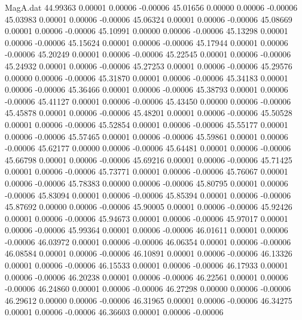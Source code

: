 \begin{filecontents}{MagA.dat}
  44.99363    0.00001    0.00006   -0.00006
  45.01656    0.00000    0.00006   -0.00006
  45.03983    0.00001    0.00006   -0.00006
  45.06324    0.00001    0.00006   -0.00006
  45.08669    0.00001    0.00006   -0.00006
  45.10991    0.00000    0.00006   -0.00006
  45.13298    0.00001    0.00006   -0.00006
  45.15624    0.00001    0.00006   -0.00006
  45.17944    0.00001    0.00006   -0.00006
  45.20249    0.00001    0.00006   -0.00006
  45.22545    0.00001    0.00006   -0.00006
  45.24932    0.00001    0.00006   -0.00006
  45.27253    0.00001    0.00006   -0.00006
  45.29576    0.00000    0.00006   -0.00006
  45.31870    0.00001    0.00006   -0.00006
  45.34183    0.00001    0.00006   -0.00006
  45.36466    0.00001    0.00006   -0.00006
  45.38793    0.00001    0.00006   -0.00006
  45.41127    0.00001    0.00006   -0.00006
  45.43450    0.00000    0.00006   -0.00006
  45.45878    0.00001    0.00006   -0.00006
  45.48201    0.00001    0.00006   -0.00006
  45.50528    0.00001    0.00006   -0.00006
  45.52854    0.00001    0.00006   -0.00006
  45.55177    0.00001    0.00006   -0.00006
  45.57465    0.00001    0.00006   -0.00006
  45.59861    0.00001    0.00006   -0.00006
  45.62177    0.00000    0.00006   -0.00006
  45.64481    0.00001    0.00006   -0.00006
  45.66798    0.00001    0.00006   -0.00006
  45.69216    0.00001    0.00006   -0.00006
  45.71425    0.00001    0.00006   -0.00006
  45.73771    0.00001    0.00006   -0.00006
  45.76067    0.00001    0.00006   -0.00006
  45.78383    0.00000    0.00006   -0.00006
  45.80795    0.00001    0.00006   -0.00006
  45.83094    0.00001    0.00006   -0.00006
  45.85394    0.00001    0.00006   -0.00006
  45.87692    0.00000    0.00006   -0.00006
  45.90005    0.00001    0.00006   -0.00006
  45.92426    0.00001    0.00006   -0.00006
  45.94673    0.00001    0.00006   -0.00006
  45.97017    0.00001    0.00006   -0.00006
  45.99364    0.00001    0.00006   -0.00006
  46.01611    0.00001    0.00006   -0.00006
  46.03972    0.00001    0.00006   -0.00006
  46.06354    0.00001    0.00006   -0.00006
  46.08584    0.00001    0.00006   -0.00006
  46.10891    0.00001    0.00006   -0.00006
  46.13326    0.00001    0.00006   -0.00006
  46.15533    0.00001    0.00006   -0.00006
  46.17933    0.00001    0.00006   -0.00006
  46.20238    0.00001    0.00006   -0.00006
  46.22561    0.00001    0.00006   -0.00006
  46.24860    0.00001    0.00006   -0.00006
  46.27298    0.00000    0.00006   -0.00006
  46.29612    0.00000    0.00006   -0.00006
  46.31965    0.00001    0.00006   -0.00006
  46.34275    0.00001    0.00006   -0.00006
  46.36603    0.00001    0.00006   -0.00006

\end{filecontents}
